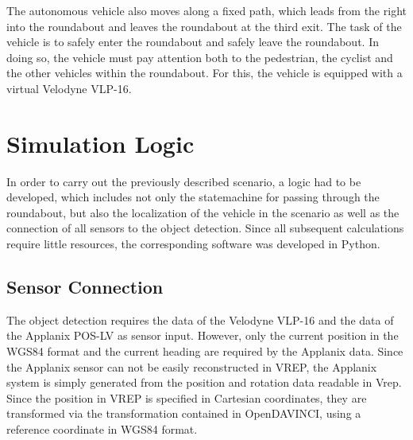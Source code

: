\documentclass[11pt,oneside,openright]{mpreport}
\begin{document}
The autonomous vehicle also moves along a fixed path, which leads from the right into the roundabout and leaves the roundabout at the third exit. 
The task of the vehicle is to safely enter the roundabout and safely leave the roundabout. In doing so, the vehicle must pay attention both to the pedestrian,
the cyclist and the other vehicles within the roundabout. For this, the vehicle is equipped with a virtual Velodyne VLP-16.

\section{Simulation Logic}


In order to carry out the previously described scenario, a logic had to be developed, which includes not only the statemachine for passing through the roundabout,
but also the localization of the vehicle in the scenario as well as the connection of all sensors to the object detection.
Since all subsequent calculations require little resources, the corresponding software was developed in Python.

\subsection{Sensor Connection}
The object detection requires the data of the Velodyne VLP-16 and the data of the Applanix POS-LV as sensor input.
However, only the current position in the WGS84 format and the current heading are required by the Applanix data.
Since the Applanix sensor can not be easily reconstructed in VREP, the Applanix system is simply generated from the position and rotation data readable in Vrep.
Since the position in VREP is specified in Cartesian coordinates, they are transformed via the transformation contained in OpenDAVINCI, using a reference coordinate in WGS84 format.
\end{document}
